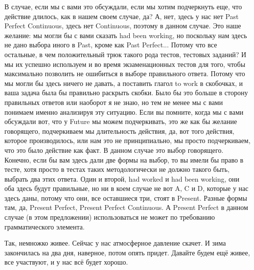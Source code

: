\documentclass[main.tex]{subfiles}
\begin{document}
В случае, если мы с вами это обсуждали, если мы хотим подчеркнуть еще, что действие длилось, как в нашем своем случае, да?
А, нет, здесь у нас нет Past Perfect Continuous, здесь нет Continuous, поэтому в данном случае.
Это наше желание: мы могли бы с вами сказать had been working, но поскольку нам здесь не дано выбора иного в Past, кроме как Past Perfect...
Потому что все остальные, в чем положительный трюк такого рода тестов, тестовых заданий?
И мы их успешно используем и во время экзаменационных тестов для того, чтобы максимально позволить не ошибиться в выборе правильного ответа.
Потому что мы могли бы здесь ничего не давать, а поставить глагол to work в скобочках, и ваша задача была бы правильно раскрыть скобки.
Было бы это больше в сторону правильных ответов или наоборот я не знаю, но тем не менее мы с вами понимаем именно анализируя эту ситуацию.
Если вы помните, когда мы с вами обсуждали вот, что у Future мы можем подчеркивать, это же как бы желание говорящего, подчеркиваем мы длительность действия, да, вот того действия, которое производилось, или нам это не принципиально, мы просто подчеркиваем, что это было действие как факт.
В данном случае это выбор говорящего.
Конечно, если бы вам здесь дали две формы на выбор, то вы имели бы право в тесте, хотя просто в тестах таких методологически не должно такого быть, выбрать два этих ответа.
Один и второй, had worked и had been working, они оба здесь будут правильные, но ни в коем случае не вот A, C и D, которые у нас здесь даны, потому что они, все оставшиеся три, стоят в Present.
Разные формы там, да, Present Perfect, Present Perfect Continuous.
А Present Perfect в данном случае (в этом предложении) использоваться не может по требованию грамматического элемента.

Так, немножко живее.
Сейчас у нас атмосферное давление скачет.
И зима закончилась на два дня, наверное, потом опять придет.
Давайте будем ещё живее, все участвуют, и у нас всё будет хорошо.
\end{document}
